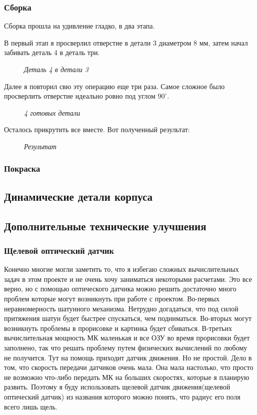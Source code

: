 \documentclass[a4paper, 12pt]{article}
\newcommand{\image}[3]{
	\begin{figure}[ht]
		\center{\texttt{[image: img/\#1]} }
		\caption{\textit{#3}}\end{figure}
}
\begin{document}
\subsubsection{Сборка}

Сборка прошла на удивление гладко, в два этапа.

В первый этап я просверлил отверстие в детали 3 диаметром 8 мм, затем
начал забивать деталь 4 в деталь три.

\image{Одна деталь.jpg}{200}{Деталь 4 в детали 3}

Далее я повторил свю эту операцию еще три раза. Самое сложное было просверлить
отверстие идеально ровно под углом $90^{\circ}$.

\image{4 детали.jpg}{200}{4 готовых детали}
Осталось прикрутить все вместе. Вот полученный результат:

\image{Получившаяся_конструкция.jpg}{200}{Результат}

\subsubsection{Покраска}
\newpage

\subsection{Динамические детали корпуса}


\subsection{Дополнительные технические улучшения}

\subsubsection{Щелевой оптический датчик}

Конечно многие могли заметить то, что я избегаю сложных вычислительных
задач в этом проекте и не очень хочу заниматься некоторыми расчетами. Это все
верно, но с помощью оптического датчика можно решить достаточно много проблем
которые могут возникнуть при работе с проектом. Во-первых неравномерность
шатунного механизма. Нетрудно догадаться, что под силой притяжения шатун будет
быстрее спускаться, чем подниматься. Во-вторых могут возникнуть проблемы
в прорисовке и картинка будет сбиваться. В-третьих вычислительная мощность МК
маленькая и все ОЗУ во время прорисовки будет заполнено, так что решать
проблему путем физических вычислений по любому не получится. Тут на помощь
приходит датчик движения. Но не простой. Дело в том, что скорость передачи
датчиков очень мала. Она мала настолько, что просто не возможно что-либо
передать МК на больших скоростях, которые я планирую развить. Поэтому я буду
использовать щелевой датчик движения(щелевой оптический датчик) из названия
которого можно понять, что радиус его поля всего лишь щель.
\end{document}
